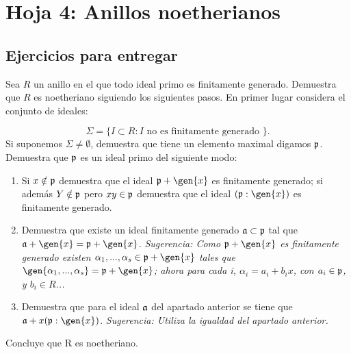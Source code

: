 \section{Hoja 4: Anillos noetherianos}

\subsection{Ejercicios para entregar}


\begin{problem}[1]
	Sea $R$ un anillo en el que todo ideal primo es finitamente generado. Demuestra que $R$ es noetheriano siguiendo los siguientes pasos. En primer lugar considera el conjunto de ideales:

	$$\Sigma = \{ I \subset R: I \text{ no es finitamente generado } \}.$$
	\ppart Si suponemos $\Sigma \neq \emptyset$, demuestra que tiene un elemento maximal digamos $\mathfrak{p}$.
	\ppart Demuestra que $\mathfrak{p}$ es un ideal primo del siguiente modo:
		\begin{enumerate}
			\item Si $x \notin \mathfrak{p}$ demuestra que el ideal $\pideal+\gen{x}$ es finitamente generado; si además $Y \notin \mathfrak{p}$ pero $xy \in \mathfrak{p}$ demuestra que el ideal $(\pideal: \gen{x})$ es finitamente generado.
			\item Demuestra que existe un ideal finitamente generado $\mathfrak{a} \subset \mathfrak{p}$ tal que $\aideal + \gen{x}=\pideal + \gen{x}$. \textit{Sugerencia: Como $\pideal+\gen{x}$ es finitamente generado existen $\alpha_1,...,\alpha_s \in \pideal + \gen{x}$ tales que $\gen{\alpha_1,...,\alpha_s}=\pideal + \gen{x}$; ahora para cada i, $\alpha_i=a_i+b_ix$, con $a_i \in \mathfrak{p}$, y $b_i \in R$...}
			\item Demuestra que para el ideal $\mathfrak{a}$ del apartado anterior se tiene que $\aideal+x(\pideal:\gen{x})$. \textit{Sugerencia: Utiliza la igualdad del apartado
			anterior.}
		\end{enumerate}
	\ppart Concluye que R es noetheriano.



\end{problem}
